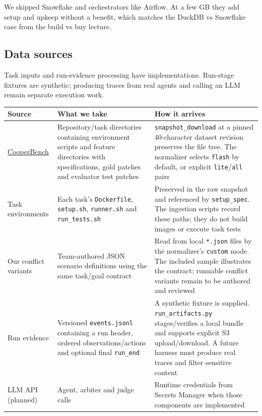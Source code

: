\documentclass[11pt]{article}
\newcommand{\code}[1]{\texttt{#1}}
\begin{document}
We skipped Snowflake and orchestrators like Airflow. At a few GB they add setup and upkeep without a benefit, which matches the DuckDB vs Snowflake case from the build vs buy lecture.

\subsection*{Data sources}

Task inputs and run-evidence processing have implementations. Run-stage fixtures are synthetic; producing traces from real agents and calling an LLM remain separate execution work.

{\small
\begin{tabularx}{\linewidth}{@{}L{2.6cm}YY@{}}
\toprule
\textbf{Source} & \textbf{What we take} & \textbf{How it arrives} \\
\midrule
\href{https://huggingface.co/datasets/CodeConflict/cooperbench-dataset}{CooperBench} & Repository/task directories containing environment scripts and feature directories with specifications, gold patches and evaluator test patches & \code{snapshot\_download} at a pinned 40-character dataset revision preserves the file tree. The normalizer selects \code{flash} by default, or explicit \code{lite}/\code{all} pairs \\
Task environments & Each task's \code{Dockerfile}, \code{setup.sh}, \code{runner.sh} and \code{run\_tests.sh} & Preserved in the raw snapshot and referenced by \code{setup\_spec}. The ingestion scripts record these paths; they do not build images or execute task tests \\
Our conflict variants & Team-authored JSON scenario definitions using the same task/goal contract & Read from local \code{*.json} files by the normalizer's \code{custom} mode. The included sample illustrates the contract; runnable conflict variants remain to be authored and reviewed \\
Run evidence & Versioned \code{events.jsonl} containing a run header, ordered observations/actions and optional final \code{run\_end} & A synthetic fixture is supplied. \code{run\_artifacts.py} stages/verifies a local bundle and supports explicit S3 upload/download. A future harness must produce real traces and filter sensitive content \\
LLM API (planned) & Agent, arbiter and judge calls & Runtime credentials from Secrets Manager when those components are implemented \\
\bottomrule
\end{tabularx}
}
\end{document}
